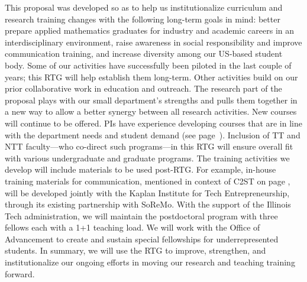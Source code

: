\documentclass[11pt]{NSFamsart}
\begin{document}
{This proposal was developed so as to help us institutionalize curriculum and research training changes with the following long-term goals in mind: better prepare applied mathematics graduates for industry and academic careers in an interdisciplinary environment, raise awareness in social responsibility and improve communication training, and increase diversity among our US-based student body. Some of our activities have successfully been piloted in the last couple of years; this RTG will help establish them long-term. Other activities build on our prior collaborative work in education and outreach. The research part of the proposal plays with our small department's strengths and pulls them together in a new way to allow a better synergy between all research activities. 
%
New courses will continue to be offered. PIs have experience developing courses that are in line with the department needs and student demand (see page~\pageref{curriculum}). Inclusion of TT and NTT faculty---who co-direct such programs---in this RTG will ensure overall fit with various undergraduate and graduate programs. 
The training activities we develop will include materials to be used post-RTG. For example, in-house training materials for communication, mentioned in context of C2ST on page \pageref{C2ST}, will be developed jointly with the Kaplan Institute for Tech Entrepreneurship, through its existing partnership with SoReMo. 
%
With the support of the Illinois Tech administration, we will maintain the postdoctoral program with three fellows each with a 1+1 teaching load. 
We will work with the Office of Advancement to create and sustain special fellowships for underrepresented students. \color{substantiate this claim somehow?? or remove??} 
In summary, we will use the RTG to improve, strengthen, and institutionalize  our ongoing efforts in moving our research and teaching training forward. 


}
\end{document}
